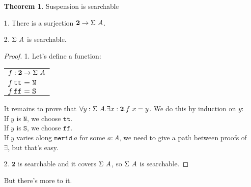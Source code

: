\documentclass[11pt]{article}
\theoremstyle{definition}
\newtheorem{theorem}{Theorem}[section]
\newcommand{\txt}[1]{\texttt{#1}}
\renewcommand{\(}{\left(}
\renewcommand{\)}{\right)}
\newcommand{\apl}[2]{#1\ #2}
\newcommand{\Bool}{\mathbf{2}}
\newcommand{\true}{\txt{tt}}
\newcommand{\false}{\txt{ff}}
\newcommand{\all}[2]{\forall #1.#2}
\newcommand{\ex}[2]{\exists #1.#2}
\begin{document}
\begin{theorem} Suspension is searchable

1. There is a surjection $\Bool \to \apl{\Susp}{A}$.

2. $\apl{\Susp}{A}$ is searchable.

\end{theorem}
\newcommand{\SuspNorth}{\txt{N}}
\newcommand{\SuspSouth}{\txt{S}}
\newcommand{\SuspMerid}{\txt{merid}}
\begin{proof}

1. Let's define a function:

\begin{center}
\begin{tabular}{l}
$f : \Bool \to \apl{\Susp}{A}$ \\
$\apl{f}{\true} = \SuspNorth$ \\
$\apl{f}{\false} = \SuspSouth$ \\
\end{tabular}
\end{center}

It remains to prove that $\all{y : \apl{\Susp}{A}}{\ex{x : \Bool}{\apl{f}{x} = y}}$. We do this by induction on $y$: \\
If $y$ is $\SuspNorth$, we choose $\true$. \\
If $y$ is $\SuspSouth$, we choose $\false$. \\
If $y$ varies along $\apl{\SuspMerid}{a}$ for some $a : A$, we need to give a path between proofs of $\exists$, but that's easy.

2. $\Bool$ is searchable and it covers $\apl{\Susp}{A}$, so $\apl{\Susp}{A}$ is searchable.

\end{proof}

But there's more to it.
\end{document}
